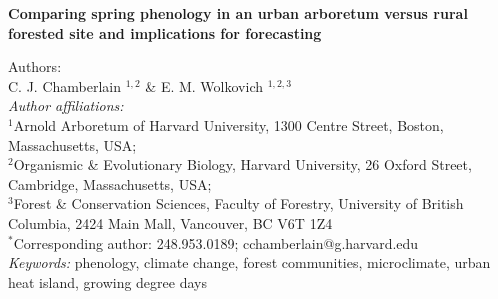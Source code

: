 \documentclass{article}\usepackage[]{graphicx}\usepackage[]{color}
\begin{document}
\noindent\textbf{\Large{Comparing spring phenology in an urban arboretum versus rural forested site and implications for forecasting}}

\noindent Authors:\\
C. J. Chamberlain $^{1,2}$ \& E. M. Wolkovich $^{1,2,3}$
\vspace{2ex}\\
\emph{Author affiliations:}\\
$^{1}$Arnold Arboretum of Harvard University, 1300 Centre Street, Boston, Massachusetts, USA; \\
$^{2}$Organismic \& Evolutionary Biology, Harvard University, 26 Oxford Street, Cambridge, Massachusetts, USA; \\
$^{3}$Forest \& Conservation Sciences, Faculty of Forestry, University of British Columbia, 2424 Main Mall, Vancouver, BC V6T 1Z4\\
\vspace{2ex}
$^*$Corresponding author: 248.953.0189; cchamberlain@g.harvard.edu\\

\noindent \emph{Keywords:} phenology, climate change, forest communities, microclimate, urban heat island, growing degree days\\

\renewcommand{\thetable}{\arabic{table}}
\renewcommand{\thefigure}{\arabic{figure}}
\renewcommand{\labelitemi}{$-$}



\newpage
\end{document}
